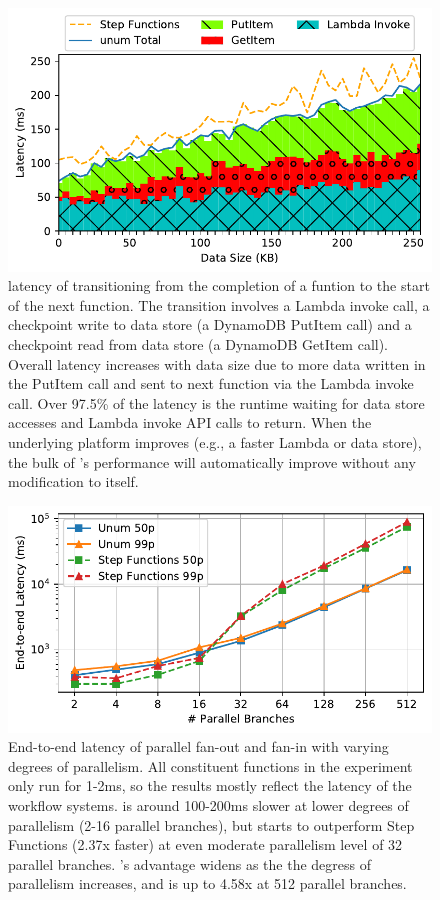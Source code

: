 \begin{figure}[t!]
	\centering
	\includegraphics[width=\columnwidth]{figures/TotalAdditionalLatencyNBreakdown.pdf}
	\caption{\name{} latency of transitioning from the completion of a funtion
		to the start of the next function. The transition involves a Lambda
		invoke call, a checkpoint write to data store (a DynamoDB PutItem call)
		and a checkpoint read from data store (a DynamoDB GetItem call). Overall
		latency increases with data size due to more data written in the PutItem
		call and sent to next function via the Lambda invoke call. Over 97.5\% of
		the latency is the
		\name{} runtime waiting for data store accesses and Lambda invoke API
		calls to return. When the underlying platform improves (e.g., a faster
		Lambda or data store), the bulk of \name{}'s performance will
		automatically improve without any modification to \name{} itself.}
	\label{fig:single-transition-latency-breakdown}
\end{figure}

\begin{figure}[t!]
	\centering
	\includegraphics[width=\columnwidth]{figures/MapMicroLatency.pdf}
	\caption{End-to-end latency of parallel fan-out and fan-in with varying
		degrees of parallelism. All constituent functions in the experiment only
		run for 1-2ms, so the results mostly reflect the latency of the workflow
		systems. \name{} is around 100-200ms slower at lower degrees of
		parallelism (2-16 parallel branches), but starts to outperform Step
		Functions (2.37x faster) at even moderate parallelism level of 32 parallel
		branches. \name{}'s advantage widens as the the degress of parallelism
		increases, and is up to 4.58x at 512 parallel branches.}
	\label{fig:mapmicrolatency}
\end{figure}

